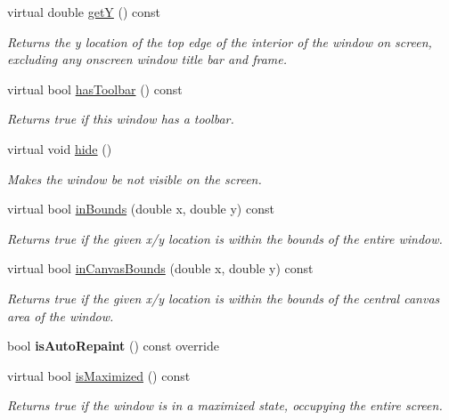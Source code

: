 \begin{DoxyCompactItemize}
virtual double \mbox{\hyperlink{classsgl_1_1GWindow_aafa51c7f8f38a09febbb9ce7853f77b4}{getY}} () const
\begin{DoxyCompactList}\small\item\em Returns the y location of the top edge of the interior of the window on screen, excluding any onscreen window title bar and frame. \end{DoxyCompactList}\item 
virtual bool \mbox{\hyperlink{classsgl_1_1GWindow_af69d0a7ce84cbbef65e40d861ef097c5}{has\+Toolbar}} () const
\begin{DoxyCompactList}\small\item\em Returns true if this window has a toolbar. \end{DoxyCompactList}\item 
virtual void \mbox{\hyperlink{classsgl_1_1GWindow_ade42eb4da4eb77db85a8d1e4b92e7be4}{hide}} ()
\begin{DoxyCompactList}\small\item\em Makes the window be not visible on the screen. \end{DoxyCompactList}\item 
virtual bool \mbox{\hyperlink{classsgl_1_1GWindow_afc480f652b8c5f1fb255e2269ce68879}{in\+Bounds}} (double x, double y) const
\begin{DoxyCompactList}\small\item\em Returns true if the given x/y location is within the bounds of the entire window. \end{DoxyCompactList}\item 
virtual bool \mbox{\hyperlink{classsgl_1_1GWindow_ae94c9ea850cba190c985dae9fc120d32}{in\+Canvas\+Bounds}} (double x, double y) const
\begin{DoxyCompactList}\small\item\em Returns true if the given x/y location is within the bounds of the central canvas area of the window. \end{DoxyCompactList}\item 
bool {\bfseries is\+Auto\+Repaint} () const override
\item 
virtual bool \mbox{\hyperlink{classsgl_1_1GWindow_a28e910de88f3ff5419710b0b0a03c2bb}{is\+Maximized}} () const
\begin{DoxyCompactList}\small\item\em Returns true if the window is in a maximized state, occupying the entire screen. \end{DoxyCompactList}\item 

\end{DoxyCompactItemize}
